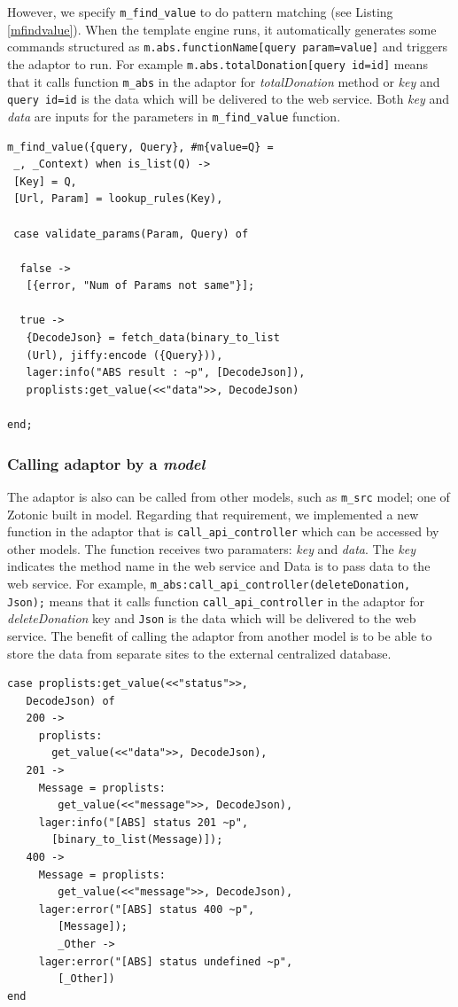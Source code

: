 \documentclass[conference]{IEEEtran}
\begin{document}
However, we specify \texttt{m\_find\_value} to do pattern matching (see Listing \ref{mfindvalue}). When the template engine runs, it automatically generates some commands structured as \texttt{m.abs.functionName[{query param=value}]} and triggers the adaptor to run. For example \texttt{{{m.abs.totalDonation[{query id=id}]}}} means that it calls function \texttt{m\_abs} in the adaptor for \textit{totalDonation} method or \textit{key} and \texttt{{query id=id}} is the data which will be delivered to the web service. Both \textit{key} and \textit{data} are inputs for the parameters in \texttt{m\_find\_value} function.

\begin{lstlisting}[caption=Implementation of m\_find\_value function, label = mfindvalue]
m_find_value({query, Query}, #m{value=Q} =
 _, _Context) when is_list(Q) ->
 [Key] = Q,
 [Url, Param] = lookup_rules(Key),
 
 case validate_params(Param, Query) of
  
  false ->
   [{error, "Num of Params not same"}];
  
  true ->
   {DecodeJson} = fetch_data(binary_to_list
   (Url), jiffy:encode ({Query})),
   lager:info("ABS result : ~p", [DecodeJson]),
   proplists:get_value(<<"data">>, DecodeJson)

end;
\end{lstlisting}


\subsubsection{Calling adaptor by a \textit{model}}
The adaptor is also can be called from other models, such as \texttt{m\_src} model; one of Zotonic built in model. Regarding that requirement, we implemented a new function in the adaptor that is \texttt{call\_api\_controller} which can be accessed by other models. The function receives two paramaters: \textit{key} and \textit{data}. The \textit{key} indicates the method name in the web service and Data is to pass data to the web service. For example, \texttt{m\_abs:call\_api\_controller(deleteDonation, Json);} means that it calls function \texttt{call\_api\_controller} in the adaptor for \textit{deleteDonation} key and \texttt{Json} is the data which will be delivered to the web service. The benefit of calling the adaptor from another model is to be able to store the data from separate sites to the external centralized database.


\begin{lstlisting}[caption=Implementation of call\_api\_controller, label = callapicont]
 case proplists:get_value(<<"status">>, 
   DecodeJson) of 
   200 ->
     proplists:
       get_value(<<"data">>, DecodeJson),
   201 ->
     Message = proplists:
        get_value(<<"message">>, DecodeJson),
     lager:info("[ABS] status 201 ~p", 
       [binary_to_list(Message)]);
   400 ->
     Message = proplists:
        get_value(<<"message">>, DecodeJson),
     lager:error("[ABS] status 400 ~p", 
        [Message]);
        _Other ->
     lager:error("[ABS] status undefined ~p", 
        [_Other])
end
\end{lstlisting}
\end{document}

